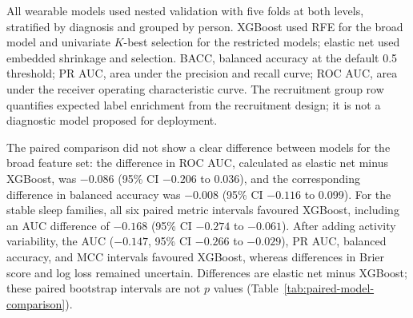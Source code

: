 \documentclass[referee,pdflatex,sn-vancouver-num]{sn-jnl}
\begin{document}
\begin{table}[t]
\caption{Core classification results from nested validation grouped by participant, using the default probability threshold.}
\label{tab:classification}
\centering
\footnotesize
\setlength{\tabcolsep}{4pt}

\medskip
\begin{minipage}{0.96\textwidth}\footnotesize
All wearable models used nested validation with five folds at both levels,
stratified by diagnosis and grouped by person. XGBoost used RFE for the broad model and univariate
$K$-best selection for the restricted models; elastic net used embedded
shrinkage and selection. BACC, balanced accuracy at the default 0.5 threshold;
PR AUC, area under the precision and recall curve; ROC AUC, area under the receiver
operating characteristic curve. The recruitment group row quantifies expected label
enrichment from the recruitment design; it is not a diagnostic model proposed
for deployment.
\end{minipage}
\end{table}

The paired comparison did not show a clear difference between models for the broad
feature set: the difference in ROC AUC, calculated as elastic net minus XGBoost,
was $-0.086$ (95\% CI $-0.206$ to 0.036), and the corresponding difference in balanced accuracy was
$-0.008$ (95\% CI $-0.116$ to 0.099). For the stable sleep families, all six
paired metric intervals favoured XGBoost, including an AUC difference of
$-0.168$ (95\% CI $-0.274$ to $-0.061$). After adding activity variability,
the AUC ($-0.147$, 95\% CI $-0.266$ to $-0.029$), PR AUC, balanced accuracy,
and MCC intervals favoured XGBoost, whereas differences in Brier score and log loss
remained uncertain. Differences are elastic net minus XGBoost;
these paired bootstrap intervals are not $p$ values
(Table~\ref{tab:paired-model-comparison}).
\end{document}

